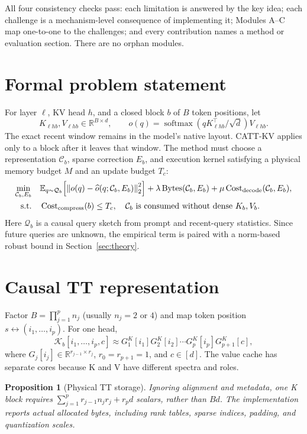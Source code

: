 \documentclass[11pt]{article}
\newtheorem{proposition}{Proposition}
\newcommand{\R}{\mathbb{R}}
\newcommand{\E}{\mathbb{E}}
\newcommand{\norm}[1]{\left\lVert #1\right\rVert}
\newcommand{\softmax}{\operatorname{softmax}}
\newcommand{\bytes}{\operatorname{Bytes}}
\newcommand{\cost}{\operatorname{Cost}}
\begin{document}
All four consistency checks pass: each limitation is answered by the key idea; each challenge is a
mechanism-level consequence of implementing it; Modules A--C map one-to-one to the challenges;
and every contribution names a method or evaluation section. There are no orphan modules.

\section{Formal problem statement}

For layer $\ell$, KV head $h$, and a closed block $b$ of $B$ token positions, let
\[
K_{\ell hb},V_{\ell hb}\in\R^{B\times d}, \qquad
o(q)=\softmax(qK_{\ell hb}^{\top}/\sqrt d)V_{\ell hb}.
\]
The exact recent window remains in the model's native layout. CATT-KV applies only to a block after
it leaves that window. The method must choose a representation $\mathcal C_b$, sparse correction
$E_b$, and execution kernel satisfying a physical memory budget $M$ and an update budget $T_c$:
\begin{align}
\min_{\mathcal C_b,E_b}\quad &
\E_{q\sim\mathcal Q_b}\!\left[\norm{o(q)-\widehat o(q;\mathcal C_b,E_b)}_2^2\right]
+\lambda\bytes(\mathcal C_b,E_b)+\mu\cost_{\rm decode}(\mathcal C_b,E_b), \label{eq:objective}\\
\text{s.t.}\quad &\cost_{\rm compress}(b)\le T_c,
\quad \mathcal C_b\text{ is consumed without dense }K_b,V_b. \nonumber
\end{align}
Here $\mathcal Q_b$ is a causal query sketch from prompt and recent-query statistics. Since future
queries are unknown, the empirical term is paired with a norm-based robust bound in
Section~\ref{sec:theory}.

\section{Causal TT representation}
\label{sec:representation}

Factor $B=\prod_{j=1}^{p}n_j$ (usually $n_j=2$ or $4$) and map token position
$s\leftrightarrow(i_1,\ldots,i_p)$. For one head,
\[
\mathcal K_b[i_1,\ldots,i_p,c]
\approx G_1^K[i_1]G_2^K[i_2]\cdots G_p^K[i_p]G_{p+1}^K[c],
\]
where $G_j[i_j]\in\R^{r_{j-1}\times r_j}$, $r_0=r_{p+1}=1$, and $c\in[d]$.
The value cache has separate cores because K and V have different spectra and roles.

\begin{proposition}[Physical TT storage]
Ignoring alignment and metadata, one K block requires
$\sum_{j=1}^{p}r_{j-1}n_jr_j+r_pd$ scalars, rather than $Bd$. The implementation reports actual
allocated bytes, including rank tables, sparse indices, padding, and quantization scales.
\end{proposition}
\end{document}
